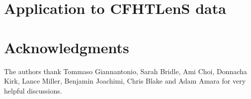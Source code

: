 \documentclass[fleqn,usenatbib]{mnras} %
\begin{document}
\section{Application to CFHTLenS data}
\label{sec:cfhtlens}




\section*{Acknowledgments}

The authors thank Tommaso Giannantonio, Sarah Bridle, Ami Choi, Donnacha Kirk, Lance Miller, Benjamin Joachimi, Chris Blake and Adam Amara for very helpful discussions.



\end{document}

